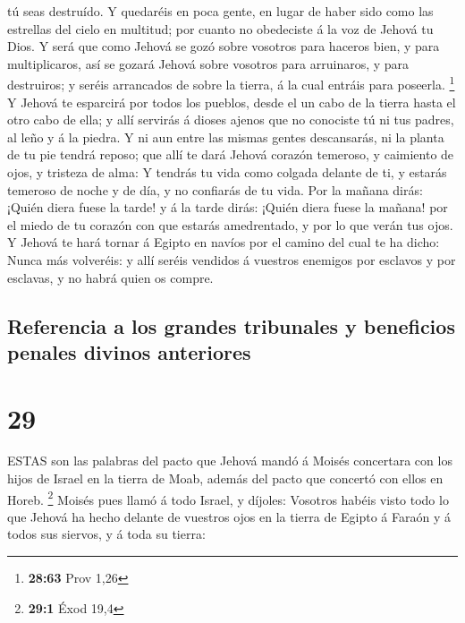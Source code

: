 tú seas destruído.  Y quedaréis en poca gente, en lugar de
haber sido como las estrellas del cielo en multitud; por cuanto no
obedeciste á la voz de Jehová tu Dios.  Y será que como
Jehová se gozó sobre vosotros para haceros bien, y para multiplicaros,
así se gozará Jehová sobre vosotros para arruinaros, y para destruiros;
y seréis arrancados de sobre la tierra, á la cual entráis para poseerla.
\footnote{\textbf{28:63} Prov 1,26}  Y Jehová te esparcirá
por todos los pueblos, desde el un cabo de la tierra hasta el otro cabo
de ella; y allí servirás á dioses ajenos que no conociste tú ni tus
padres, al leño y á la piedra.  Y ni aun entre las mismas
gentes descansarás, ni la planta de tu pie tendrá reposo; que allí te
dará Jehová corazón temeroso, y caimiento de ojos, y tristeza de alma:
 Y tendrás tu vida como colgada delante de ti, y estarás
temeroso de noche y de día, y no confiarás de tu vida.  Por
la mañana dirás: ¡Quién diera fuese la tarde! y á la tarde dirás: ¡Quién
diera fuese la mañana! por el miedo de tu corazón con que estarás
amedrentado, y por lo que verán tus ojos.  Y Jehová te hará
tornar á Egipto en navíos por el camino del cual te ha dicho: Nunca más
volveréis: y allí seréis vendidos á vuestros enemigos por esclavos y por
esclavas, y no habrá quien os compre.

\hypertarget{referencia-a-los-grandes-tribunales-y-beneficios-penales-divinos-anteriores}{%
\subsection{Referencia a los grandes tribunales y beneficios penales
divinos
anteriores}\label{referencia-a-los-grandes-tribunales-y-beneficios-penales-divinos-anteriores}}

\hypertarget{section-28}{%
\section{29}\label{section-28}}

 ESTAS son las palabras del pacto que Jehová mandó á Moisés
concertara con los hijos de Israel en la tierra de Moab, además del
pacto que concertó con ellos en Horeb. \footnote{\textbf{29:1} Éxod 19,4}
 Moisés pues llamó á todo Israel, y díjoles: Vosotros habéis
visto todo lo que Jehová ha hecho delante de vuestros ojos en la tierra
de Egipto á Faraón y á todos sus siervos, y á toda su tierra:

